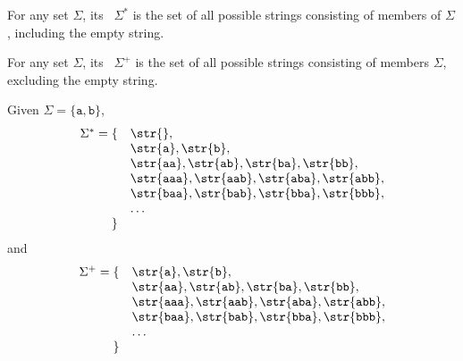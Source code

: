 \begin{flex}
\begin{definition}
For any set $\Sigma$, its~ $\Sigma^*$ is the set of
all possible strings consisting of members of $\Sigma$, including the
empty string.

For any set $\Sigma$, its~ $\Sigma^+$ is the set of
all possible strings consisting of members $\Sigma$, excluding the
empty string.
\end{definition}

\begin{example}
Given $\Sigma = \{\texttt{a},\texttt{b}\}$,
\[
\begin{array}{rl}
\Sigma^* 
%
= 
%
\{
&
\str{}, 
%
\\
&
\str{\texttt{a}}, \str{\texttt{b}}, 
%
\\
&
\str{\texttt{aa}}, \str{\texttt{ab}}, 
\str{\texttt{ba}}, \str{\texttt{bb}}, 
\\
%
&
\str{\texttt{aaa}}, \str{\texttt{aab}}, \str{\texttt{aba}},
\str{\texttt{abb}},
\\
& \str{\texttt{baa}}, \str{\texttt{bab}}, \str{\texttt{bba}}, \str{\texttt{bbb}},
\\
%
&
\ldots
\\
\} &
\end{array}
\]
%
and
%
\[
\begin{array}{rl}
\Sigma^+ 
%
= 
%
\{
&
\str{\texttt{a}}, \str{\texttt{b}}, 
\\
%
&
\str{\texttt{aa}}, \str{\texttt{ab}}, 
\str{\texttt{ba}}, \str{\texttt{bb}}, 
\\
%
&
\str{\texttt{aaa}}, \str{\texttt{aab}}, \str{\texttt{aba}}, \str{\texttt{abb}}, 
\\
&
\str{\texttt{baa}}, \str{\texttt{bab}}, \str{\texttt{bba}}, 
\str{\texttt{bbb}},
\\
%
& \ldots
\\
\} & 
\\
\end{array}
\]
\end{example}
\end{flex}



